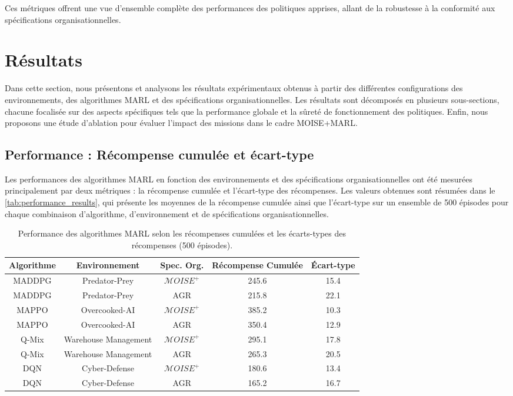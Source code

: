 \documentclass[sigconf,anonymous]{aamas}
\begin{document}
Ces métriques offrent une vue d'ensemble complète des performances des politiques apprises, allant de la robustesse à la conformité aux spécifications organisationnelles.

\section{Résultats}
\label{sec:results}

Dans cette section, nous présentons et analysons les résultats expérimentaux obtenus à partir des différentes configurations des environnements, des algorithmes MARL et des spécifications organisationnelles. Les résultats sont décomposés en plusieurs sous-sections, chacune focalisée sur des aspects spécifiques tels que la performance globale et la sûreté de fonctionnement des politiques. Enfin, nous proposons une étude d'ablation pour évaluer l'impact des missions dans le cadre MOISE+MARL.

\subsection{Performance : Récompense cumulée et écart-type}

Les performances des algorithmes MARL en fonction des environnements et des spécifications organisationnelles ont été mesurées principalement par deux métriques : la récompense cumulée et l'écart-type des récompenses. Les valeurs obtenues sont résumées dans le \autoref{tab:performance_results}, qui présente les moyennes de la récompense cumulée ainsi que l'écart-type sur un ensemble de 500 épisodes pour chaque combinaison d'algorithme, d'environnement et de spécifications organisationnelles.

\begin{table*}[h!]
    \centering
    \caption{Performance des algorithmes MARL selon les récompenses cumulées et les écarts-types des récompenses (500 épisodes).}
    \label{tab:performance_results}
    \begin{tabular}{|c|c|c|c|c|}
        \hline
        \textbf{Algorithme} & \textbf{Environnement} & \textbf{Spec. Org.} & \textbf{Récompense Cumulée} & \textbf{Écart-type} \\ \hline
        MADDPG & Predator-Prey & $\mathcal{M}OISE^+$ & 245.6 & 15.4 \\ \hline
        MADDPG & Predator-Prey & AGR & 215.8 & 22.1 \\ \hline
        MAPPO & Overcooked-AI & $\mathcal{M}OISE^+$ & 385.2 & 10.3 \\ \hline
        MAPPO & Overcooked-AI & AGR & 350.4 & 12.9 \\ \hline
        Q-Mix & Warehouse Management & $\mathcal{M}OISE^+$ & 295.1 & 17.8 \\ \hline
        Q-Mix & Warehouse Management & AGR & 265.3 & 20.5 \\ \hline
        DQN & Cyber-Defense & $\mathcal{M}OISE^+$ & 180.6 & 13.4 \\ \hline
        DQN & Cyber-Defense & AGR & 165.2 & 16.7 \\ \hline
    \end{tabular}
\end{table*}
\end{document}
